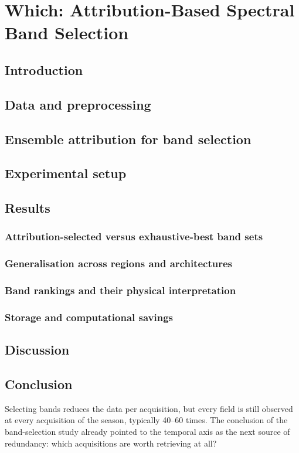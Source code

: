 \chapter{Which: Attribution-Based Spectral Band Selection}
\label{ch:which}


\section{Introduction}

\section{Data and preprocessing}

\section{Ensemble attribution for band selection}

\section{Experimental setup}

\section{Results}
\subsection{Attribution-selected versus exhaustive-best band sets}
\subsection{Generalisation across regions and architectures}
\subsection{Band rankings and their physical interpretation}
\subsection{Storage and computational savings}

\section{Discussion}

\section{Conclusion}

\begin{bridge}
Selecting bands reduces the data per acquisition, but every field is still
observed at every acquisition of the season, typically 40--60 times. The
conclusion of the band-selection study already pointed to the temporal axis as
the next source of redundancy: which acquisitions are worth retrieving at all?
\end{bridge}
